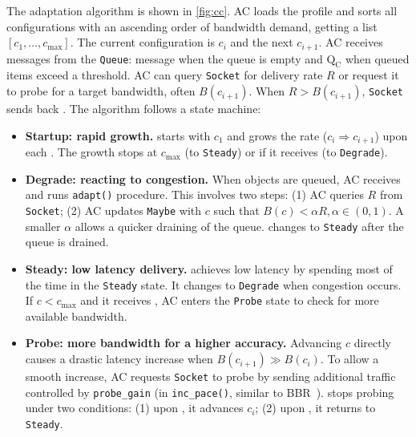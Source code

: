 The adaptation algorithm is shown in \autoref{fig:cc}. AC loads the profile and
sorts all configurations with an ascending order of bandwidth demand, getting a
list $[c_1, \dots, c_{\max}]$. The current configuration is $c_i$ and the next
$c_{i+1}$. AC receives messages from the \texttt{Queue}: message \qe{} when the
queue is empty and $\text{Q}_\text{C}$ when queued items exceed a threshold. AC
can query \texttt{Socket} for delivery rate $R$ or request it to probe for a
target bandwidth, often $B(c_{i+1})$. When $R > B(c_{i+1})$, \texttt{Socket}
sends back \spd{}. The algorithm follows a state machine:

\begin{itemize}[leftmargin=*]

\item \textbf{Startup: rapid growth.} \sysname{} starts with $c_1$ and grows the
  rate ($c_i \Rightarrow c_{i+1}$) upon each \qe{}. The growth stops at
  $c_{\max}$ (to \texttt{Steady}) or if it receives \qc{} (to \texttt{Degrade}).

\item \textbf{Degrade: reacting to congestion.} When objects are queued, AC
  receives \qc{} and runs \texttt{adapt()} procedure. This involves two steps:
  (1) AC queries $R$ from \texttt{Socket}; (2) AC updates \texttt{Maybe} with
  $c$ such that $B(c) < \alpha R, \alpha \in (0, 1)$. A smaller $\alpha$ allows
  a quicker draining of the queue. \sysname{} changes to \texttt{Steady} after
  the queue is drained.

\item \textbf{Steady: low latency delivery.} \sysname{} achieves low latency by
  spending most of the time in the \texttt{Steady} state. It changes to
  \texttt{Degrade} when congestion occurs. If $c < c_{\max}$ and it receives
  \qe{}, AC enters the \texttt{Probe} state to check for more available
  bandwidth.

\item \textbf{Probe: more bandwidth for a higher accuracy.} Advancing $c$
  directly causes a drastic latency increase when $B(c_{i+1}) \gg B(c_i)$. To
  allow a smooth increase, AC requests \texttt{Socket} to probe by sending
  additional traffic controlled by \texttt{probe\_gain} (in
  \texttt{inc\_pace()}, similar to BBR~\cite{cardwell2017bbr}). \sysname{} stops
  probing under two conditions: (1) upon \spd{}, it advances $c_i$; (2) upon
  \qc{}, it returns to \texttt{Steady}.

\end{itemize}

